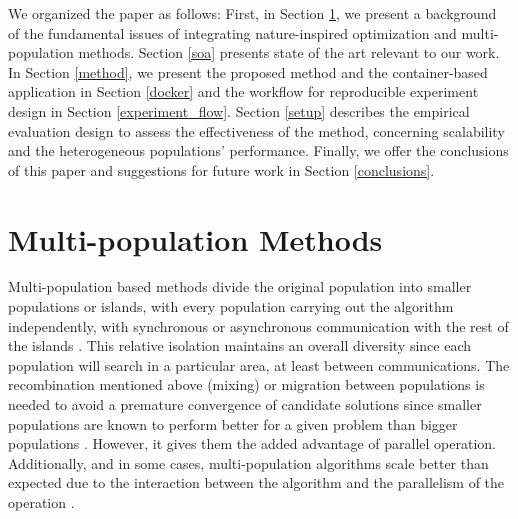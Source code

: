 \documentclass[review]{elsarticle}
\begin{document}
We organized the paper as follows: First, in Section \ref{multi}, we present a
background of the fundamental issues of integrating nature-inspired optimization
and multi-population methods. Section \ref{soa} presents state of the art relevant to
our work. In Section \ref{method}, we present the proposed method and the container-based
application in Section \ref{docker} and the workflow for reproducible experiment design in Section \ref{experiment_flow}. %
Section \ref{setup} describes the empirical evaluation design to assess the effectiveness
of the method, concerning scalability and %
the heterogeneous populations' performance.  %
Finally, we offer the conclusions of this paper and suggestions for future work in Section \ref{conclusions}.


\section{Multi-population Methods} %
\label{multi}

Multi-population based methods divide the original population into
smaller populations or islands, with every population carrying out the
algorithm independently, with synchronous or asynchronous communication with the
rest of the islands \cite{Ma2019}.%
This relative isolation maintains an overall
diversity since each population will search in a particular area, at least
between communications. The recombination mentioned above (mixing) or migration
between populations is needed to avoid a premature convergence of candidate
solutions since smaller populations are known to perform better for a given
problem than bigger populations \cite{li2016multi,wu2016differential}. %
However, it gives them the added advantage of
parallel operation. Additionally, and in some cases, multi-population algorithms
scale better than expected due to the interaction between the algorithm and the
parallelism of the operation \cite{ALBA20027}. %
\end{document}
